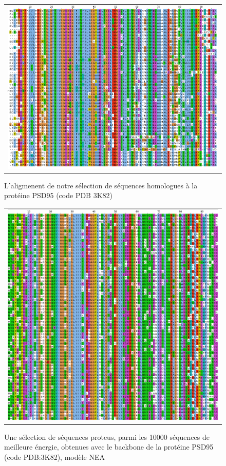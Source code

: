    \begin{figure}[t]
     \centering
     \begin{tabular}{c}
       \includegraphics[width=17cm]{homologues/3K82.png} \\
     \end{tabular}
     \caption{L'aligmenent de notre sélection de séquences homologues à la protéine PSD95 (code PDB 3K82)}
\label{align_homo:PSD95}
   \end{figure}

   \begin{figure}[t]
     \centering
     \begin{tabular}{c}
       \includegraphics[width=17cm]{proteus/3K82.png} \\
     \end{tabular}
       \caption{Une sélection de séquences proteus, parmi les 10000 séquences de meilleure énergie, obtenues avec le backbone de la protéine PSD95 (code PDB:3K82), modèle NEA}
\label{align_proteus:PSD95}
   \end{figure}
\clearpage

